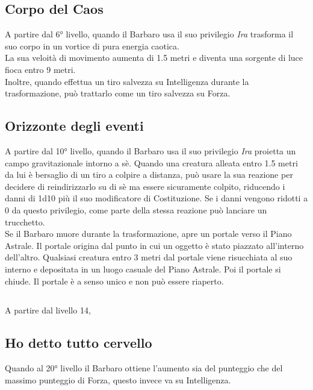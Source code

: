 \subsection{Corpo del Caos}
A partire dal 6° livello, quando il Barbaro usa il suo privilegio \textit{Ira} trasforma il suo corpo in un vortice di pura energia caotica.\\
La sua veloità di movimento aumenta di 1.5 metri e diventa una sorgente di luce fioca entro 9 metri.\\
Inoltre, quando effettua un tiro salvezza su Intelligenza durante la trasformazione, può trattarlo come un tiro salvezza su Forza.

\subsection{Orizzonte degli eventi}
A partire dal 10° livello, quando il Barbaro usa il suo privilegio \textit{Ira} proietta un campo gravitazionale intorno a sè. Quando una creatura alleata entro 1.5 metri da lui è bersaglio di un tiro a colpire a distanza, può usare la sua reazione per decidere di reindirizzarlo su di sè ma essere sicuramente colpito, riducendo i danni di 1d10 più il suo modificatore di Costituzione. Se i danni vengono ridotti a 0 da questo privilegio, come parte della stessa reazione può lanciare un trucchetto.\\
Se il Barbaro muore durante la trasformazione, apre un portale verso il Piano Astrale. Il portale origina dal punto in cui un oggetto è stato piazzato all'interno dell'altro. Qualsiasi creatura entro 3 metri dal portale viene risucchiata al suo interno e depositata in un luogo casuale del Piano Astrale. Poi il portale si chiude. Il portale è a senso unico e non può essere riaperto.

\subsection{}
A partire dal livello 14, 

\subsection{Ho detto tutto cervello}
Quando al 20° livello il Barbaro ottiene l'aumento sia del punteggio che del massimo punteggio di Forza, questo invece va su Intelligenza.